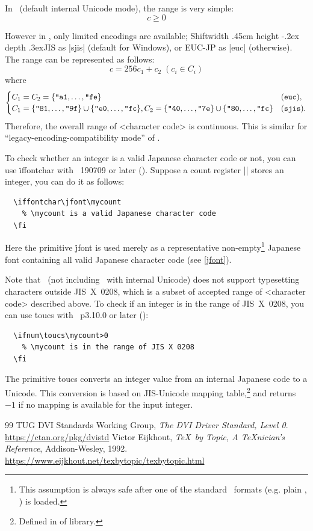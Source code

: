 \documentclass[a4paper,11pt,dvipdfmx]{article}
\let\emph=\origemph
\def\_{\leavevmode\vrule width .45em height -.2ex depth .3ex\relax}
\begin{document}
In \upTeX\ (default internal Unicode mode), the range is very simple:
\[ c \ge 0 \]

However in \pTeX, only limited encodings are available;
Shift\_JIS as |sjis| (default for \TL Windows), or
EUC-JP as |euc| (otherwise).
The range can be represented as follows:
\[
  c = 256c_1+c_2 \; (c_i\in C_i)
\]
where
\[
  \begin{cases}
    C_1=C_2=\{\hex{a1},\dots,\hex{fe}\} & (\mathtt{euc}), \\
    C_1=\{\hex{81},\dots,\hex{9f}\}\cup\{\hex{e0},\dots,\hex{fc}\},
    C_2=\{\hex{40},\dots,\hex{7e}\}\cup\{\hex{80},\dots,\hex{fc}\} & (\mathtt{sjis}).
  \end{cases}
\]
Therefore, the overall range of <character code> is \emph{not} continuous.
This is similar for ``legacy-encoding-compatibility mode'' of \upTeX.

To check whether an integer is a valid Japanese character code or not,
you can use \.{iffontchar} with \epTeX~190709 or later ().
Suppose a count register |\mycount| stores an integer, you can do it as follows:
\begin{verbatim}
  \iffontchar\jfont\mycount
    % \mycount is a valid Japanese character code
  \fi
\end{verbatim}
Here the primitive \.{jfont} is used merely as
a representative non-empty\footnote{This assumption is always safe after
one of the standard \pTeX\ formats (e.g. plain \pTeX, \pLaTeX) is loaded.}
Japanese font containing all valid Japanese character code (see \ref{jfont}).

Note that \pTeX\ (not including \upTeX\ with internal Unicode) does not
support typesetting characters outside JIS~X~0208,
which is a subset of accepted range of <character code> described above.
To check if an integer is in the range of JIS~X~0208,
you can use \.{toucs} with \pTeX~p3.10.0 or later ():
\begin{verbatim}
  \ifnum\toucs\mycount>0
    % \mycount is in the range of JIS X 0208
  \fi
\end{verbatim}
The primitive \.{toucs} converts an integer value
from an internal Japanese code to a Unicode.
This conversion is based on JIS-Unicode mapping table,\footnote{Defined in
 of  library.} and returns $-1$
if no mapping is available for the input integer.


\newpage

\begin{thebibliography}{99}
  TUG DVI Standards Working Group,
  \textit{The DVI Driver Standard, Level 0}.\\
  \url{https://ctan.org/pkg/dvistd}
  Victor Eijkhout, \textit{\TeX\ by Topic, A \TeX nician's Reference},
  Addison-Wesley, 1992.\\
  \url{https://www.eijkhout.net/texbytopic/texbytopic.html}
\end{thebibliography}

\newpage
\printindex
\end{document}
